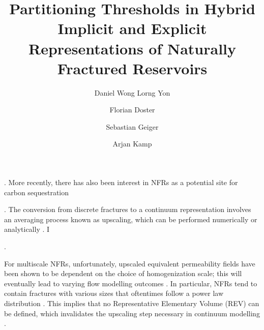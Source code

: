 \documentclass[a4paper]{article}
\title{Partitioning Thresholds in Hybrid Implicit and Explicit Representations of Naturally Fractured Reservoirs}
\author{Daniel Wong Lorng Yon \and Florian Doster \and Sebastian Geiger \and Arjan Kamp}
\begin{document}
	\citep{Priest1993}
	\citep{Lee2001, Lie2015, Moinfar2013}
	
	\citep{Berkowitz2002}. More recently, there has also been 
	interest in NFRs as a potential site for carbon sequestration \citep{March2018}
	
	 \citep{Ezulike2013, Warren1963, Yan2016}. The conversion from discrete fractures to a continuum representation involves an averaging process known as upscaling, which can be performed numerically or analytically \citep{Durlofsky1991,Oda1985,Renard1997,Saevik2013}. I
	 
	 \citep{Oda1985, Saevik2013, Saevik2014}. 
	 
	 For multiscale NFRs, unfortunately, upscaled equivalent permeability fields have been shown to be dependent on the choice of homogenization scale; this will eventually lead to varying flow modelling outcomes \citep{Elfeel2013}. In particular, NFRs tend to contain fractures with various sizes that oftentimes follow a power law distribution \citep{Bonnet2001}. This implies that no Representative Elementary Volume (REV) can be defined, which invalidates the upscaling step necessary in continuum modelling \citep{Berkowitz2002}.
	 
	 \citep{Lee2001, Lie2015, Moinfar2013}
	
	
	
\end{document}

